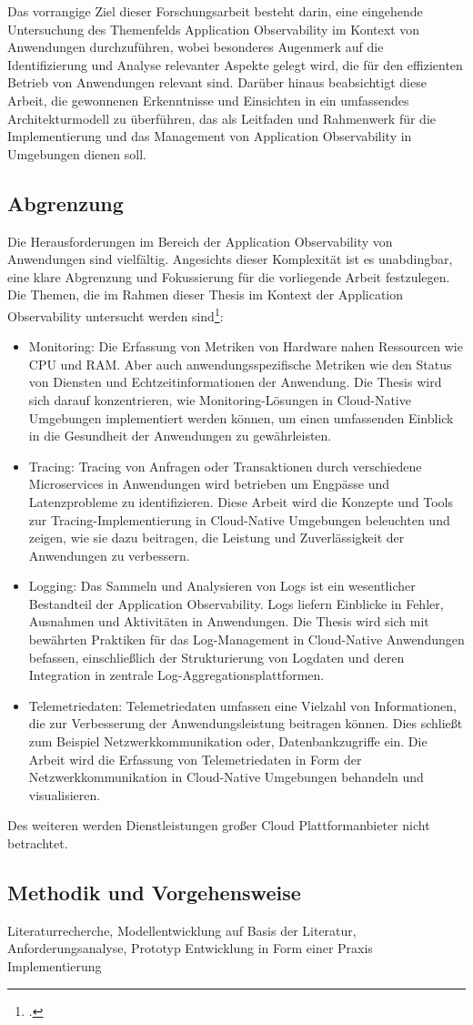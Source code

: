 Das vorrangige Ziel dieser Forschungsarbeit besteht darin, eine eingehende Untersuchung des Themenfelds Application Observability im Kontext von \cn Anwendungen durchzuführen, wobei besonderes Augenmerk auf die Identifizierung und Analyse relevanter Aspekte gelegt wird, die für den effizienten Betrieb von Anwendungen relevant sind. Darüber hinaus beabsichtigt diese Arbeit, die gewonnenen Erkenntnisse und Einsichten in ein umfassendes Architekturmodell zu überführen, das als Leitfaden und Rahmenwerk für die Implementierung und das Management von Application Observability in \cn Umgebungen dienen soll.

\subsection{Abgrenzung}
Die Herausforderungen im Bereich der Application Observability von \cn Anwendungen sind vielfältig. Angesichts dieser Komplexität ist es unabdingbar, eine klare Abgrenzung und Fokussierung für die vorliegende Arbeit festzulegen. Die Themen, die im Rahmen dieser Thesis im Kontext der Application Observability untersucht werden sind\footcite[Vgl.][S.5]{Pourmajidi2023}:
\begin{itemize}
	\item Monitoring: Die Erfassung von Metriken von Hardware nahen Ressourcen wie CPU und RAM. Aber auch anwendungsspezifische Metriken wie den Status von Diensten und Echtzeitinformationen der Anwendung. Die Thesis wird sich darauf konzentrieren, wie Monitoring-Lösungen in Cloud-Native Umgebungen implementiert werden können, um einen umfassenden Einblick in die Gesundheit der Anwendungen zu gewährleisten.
	\item Tracing: Tracing von Anfragen oder Transaktionen durch verschiedene Microservices in \cn Anwendungen wird betrieben um Engpässe und Latenzprobleme zu identifizieren. Diese Arbeit wird die Konzepte und Tools zur Tracing-Implementierung in Cloud-Native Umgebungen beleuchten und zeigen, wie sie dazu beitragen, die Leistung und Zuverlässigkeit der Anwendungen zu verbessern.
	\item Logging: Das Sammeln und Analysieren von Logs ist ein wesentlicher Bestandteil der Application Observability. Logs liefern Einblicke in Fehler, Ausnahmen und Aktivitäten in Anwendungen. Die Thesis wird sich mit bewährten Praktiken für das Log-Management in Cloud-Native Anwendungen befassen, einschließlich der Strukturierung von Logdaten und deren Integration in zentrale Log-Aggregationsplattformen.
	\item Telemetriedaten: Telemetriedaten umfassen eine Vielzahl von Informationen, die zur Verbesserung der Anwendungsleistung beitragen können. Dies schließt zum Beispiel Netzwerkkommunikation oder, Datenbankzugriffe ein. Die Arbeit wird die Erfassung von Telemetriedaten in Form der Netzwerkkommunikation in Cloud-Native Umgebungen behandeln und visualisieren.
\end{itemize}

Des weiteren werden Dienstleistungen großer Cloud Plattformanbieter nicht betrachtet.

\subsection{Methodik und Vorgehensweise}


Literaturrecherche, Modellentwicklung auf Basis der Literatur, Anforderungsanalyse, Prototyp Entwicklung in Form einer Praxis Implementierung